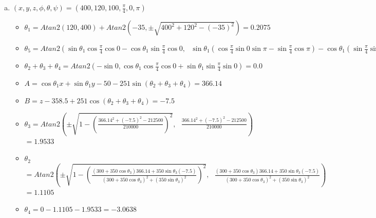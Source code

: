 \documentclass[12pt, a4paper]{article}
\begin{document}
\begin{enumerate}[(1)]
\begin{enumerate}[(a)]
\item
$(x, y, z, \phi, \theta, \psi) = (400, 120, 100, \frac{\pi}{4}, 0, \pi)$ 
\begin{itemize}
\item
$\theta_1 = Atan2(120, 400) + Atan2(-35, \pm \sqrt{400^2 + 120^2 - (-35)^2}) = 0.2075$ 
\item
$\theta_5 = Atan2(\sin \theta_1 \cos \frac{\pi}{4} \cos 0 - \cos \theta_1 \sin \frac{\pi}{4} \cos 0, \mbox{ } \sin \theta_1(\cos\frac{\pi}{4} \sin 0 \sin\pi - \sin\frac{\pi}{4} \cos\pi) - \cos\theta_1(\sin\frac{\pi}{4} \sin0 \sin\pi + \cos\frac{\pi}{4} \cos\pi)) = -0.5778$
\item
$\theta_2 + \theta_3 + \theta_4 = Atan2(-\sin 0, \cos\theta_1 \cos\frac{\pi}{4} \cos0 + \sin\theta_1 \sin\frac{\pi}{4} \sin0) = 0.0$
\item
$A = \cos\theta_1 x + \sin\theta_1 y - 50 - 251\sin(\theta_2 + \theta_3 + \theta_4) = 366.14$
\item
$B = z - 358.5 + 251\cos(\theta_2 + \theta_3 + \theta_4) = -7.5$
\item
$\theta_3 = Atan2(\pm \sqrt{1 - (\frac{366.14^2 + (-7.5)^2 - 212500}{210000})^2}, \mbox{ } \frac{366.14^2 + (-7.5)^2 - 212500}{210000})$ \\ $=1.9533$
\item
$\theta_2$ \\ $= Atan2(\pm \sqrt{1 - (\frac{(300 + 350\cos\theta_3)366.14 + 350\sin\theta_3 (-7.5)}{(300 + 350\cos\theta_3)^2 + (350\sin\theta_3)^2})^2}, \mbox{ } \frac{(300 + 350\cos\theta_3)366.14 + 350\sin\theta_3 (-7.5)}{(300 + 350\cos\theta_3)^2 + (350\sin\theta_3)^2})$ \\ $=1.1105$
\item
$\theta_4 = 0 - 1.1105 - 1.9533 = -3.0638$
\end{itemize}


\end{enumerate}
\end{enumerate}
\end{document}
